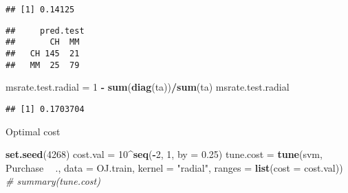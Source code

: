 \documentclass[]{article}
\newenvironment{Shaded}{\begin{snugshade}}{\end{snugshade}}
\newcommand{\CommentTok}[1]{\textcolor[rgb]{0.56,0.35,0.01}{\textit{#1}}}
\newcommand{\DataTypeTok}[1]{\textcolor[rgb]{0.13,0.29,0.53}{#1}}
\newcommand{\DecValTok}[1]{\textcolor[rgb]{0.00,0.00,0.81}{#1}}
\newcommand{\FloatTok}[1]{\textcolor[rgb]{0.00,0.00,0.81}{#1}}
\newcommand{\KeywordTok}[1]{\textcolor[rgb]{0.13,0.29,0.53}{\textbf{#1}}}
\newcommand{\NormalTok}[1]{#1}
\newcommand{\OperatorTok}[1]{\textcolor[rgb]{0.81,0.36,0.00}{\textbf{#1}}}
\newcommand{\StringTok}[1]{\textcolor[rgb]{0.31,0.60,0.02}{#1}}
\begin{document}
\begin{verbatim}
## [1] 0.14125
\end{verbatim}

\begin{Shaded}
\end{Shaded}

\begin{verbatim}
##     pred.test
##       CH  MM
##   CH 145  21
##   MM  25  79
\end{verbatim}

\begin{Shaded}
\begin{Highlighting}[]
\NormalTok{msrate.test.radial =}\StringTok{ }\DecValTok{1} \OperatorTok{-}\StringTok{ }\KeywordTok{sum}\NormalTok{(}\KeywordTok{diag}\NormalTok{(ta))}\OperatorTok{/}\KeywordTok{sum}\NormalTok{(ta)}
\NormalTok{msrate.test.radial}
\end{Highlighting}
\end{Shaded}

\begin{verbatim}
## [1] 0.1703704
\end{verbatim}

Optimal cost

\begin{Shaded}
\begin{Highlighting}[]
\KeywordTok{set.seed}\NormalTok{(}\DecValTok{4268}\NormalTok{)}
\NormalTok{cost.val =}\StringTok{ }\DecValTok{10}\OperatorTok{^}\KeywordTok{seq}\NormalTok{(}\OperatorTok{-}\DecValTok{2}\NormalTok{, }\DecValTok{1}\NormalTok{, }\DataTypeTok{by =} \FloatTok{0.25}\NormalTok{)}
\NormalTok{tune.cost =}\StringTok{ }\KeywordTok{tune}\NormalTok{(svm, Purchase }\OperatorTok{~}\StringTok{ }\NormalTok{., }\DataTypeTok{data =}\NormalTok{ OJ.train, }\DataTypeTok{kernel =} \StringTok{"radial"}\NormalTok{, }\DataTypeTok{ranges =} \KeywordTok{list}\NormalTok{(}\DataTypeTok{cost =}\NormalTok{ cost.val))}
\CommentTok{# summary(tune.cost)}
\end{Highlighting}
\end{Shaded}

\begin{Shaded}
\end{Shaded}
\end{document}
